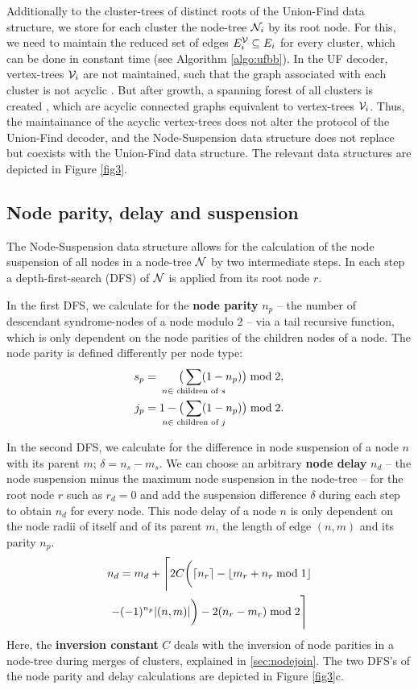 Additionally to the cluster-trees of distinct roots of the Union-Find data structure, we store for each cluster the node-tree $\mathcal{N}_i$ by its root node. For this, we need to maintain the reduced set of edges $E^{\mathcal{V}}_i \subseteq E_i$ for every cluster, which can be done in constant time (see Algorithm \ref{algo:ufbb}). In the UF decoder, vertex-trees $\mathcal{V}_i$ are not maintained, such that the graph associated with each cluster is not acyclic \cite{delfosse2017almost}. But after growth, a spanning forest of all clusters is created \cite{delfosse2017linear}, which are acyclic connected graphs equivalent to vertex-trees $\mathcal{V}_i$. Thus, the maintainance of the acyclic vertex-trees does not alter the protocol of the Union-Find decoder, and the Node-Suspension data structure does not replace but coexists with the Union-Find data structure. The relevant data structures are depicted in Figure \ref{fig3}. 


\subsection{Node parity, delay and suspension}\label{sec:paritydelaysus}

The Node-Suspension data structure allows for the calculation of the node suspension of all nodes in a node-tree $\mathcal{N}$ by two intermediate steps. In each step a depth-first-search (DFS) of $\mathcal{N}$ is applied from its root node $r$.

In the first DFS, we calculate for the \textbf{node parity} $n_p$ -- the number of descendant syndrome-nodes of a node modulo 2 -- via a tail recursive function, which is only dependent on the node parities of the children nodes of a node. The node parity is defined differently per node type:
\begin{align}\label{eq:nodeparity}
    s_p &= \hspace{.6cm}\big( \sum_{\mathclap{n \in \text{ children of } s}} (1-n_p) \big ) \bmod 2,\\
    j_p &= 1 - \big(\sum_{\mathclap{n \in \text{ children of } j}} (1-n_p) \big) \bmod 2.
\end{align}

In the second DFS, we calculate for the difference in node suspension of a node $n$ with its parent $m$; $\delta = n_s - m_s$. We can choose an arbitrary \textbf{node delay} $n_d$ -- the node suspension minus the maximum node suspension in the node-tree -- for the root node $r$ such as $r_d=0$ and add the suspension difference $\delta$ during each step to obtain $n_d$ for every node. This node delay of a node $n$ is only dependent on the node radii of itself and of its parent $m$, the length of edge $(n,m)$ and its parity $n_p$. 
\begin{multline}\label{eq:delayequation}
    n_d = m_d + \Bigg \lceil 2C\bigg(\ceil{n_r} - \floor{m_r + n_r \bmod 1}\\
    - (-1)^{n_p}\abs{(n,m)}\bigg) - 2(n_r - m_r) \bmod2 \Bigg \rceil
\end{multline}
Here, the \textbf{inversion constant} $C$ deals with the inversion of node parities in a node-tree during merges of clusters, explained in \ref{sec:nodejoin}. The two DFS's of the node parity and delay calculations are depicted in Figure \ref{fig3}c. 

